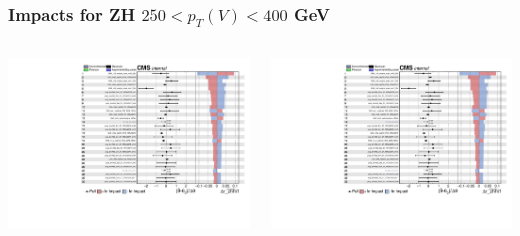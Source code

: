 \documentclass{beamer}
\begin{document}
\begin{frame}
  \frametitle{Impacts for ZH $250 < p_T(V) < 400$ GeV}
  \centering
  \begin{columns}
    \begin{column}{0.5\linewidth}
      \includegraphics[width=0.85\linewidth,page=1]{figures/impacts/impacts_r_zhhi1.pdf}
    \end{column}
    \begin{column}{0.5\linewidth}
      \includegraphics[width=0.85\linewidth,page=2]{figures/impacts/impacts_r_zhhi1.pdf}
    \end{column}
  \end{columns}
\end{frame}
\end{document}
